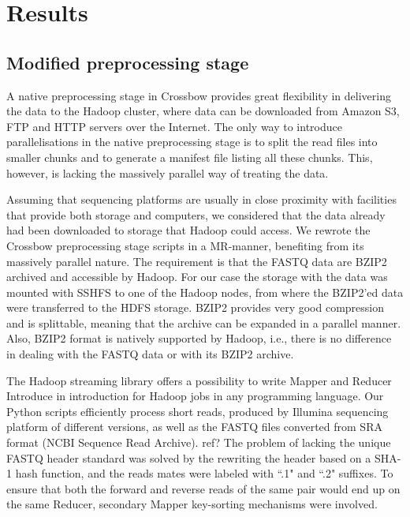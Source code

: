 \documentclass[11pt, oneside]{article}   	%
\newcommand{\COMMENT}[1]{{\color{red} #1 }}
\begin{document}
\section{Results}
\label{sectionIII}

\subsection{Modified preprocessing stage}
A native preprocessing stage in Crossbow provides great flexibility in delivering the data to the Hadoop cluster, where data can be downloaded from Amazon S3, FTP and HTTP servers over the Internet\cite{crossbow}. The only way to introduce parallelisations in the native preprocessing stage is to split the read files into smaller chunks and to generate a manifest file listing all these chunks. This, however, is lacking the massively parallel way of treating the data.


Assuming that sequencing platforms are usually in close proximity with facilities that provide both storage and computers, we considered that the data already had been downloaded to storage that Hadoop could access.
We rewrote the Crossbow preprocessing stage scripts in a MR-manner, benefiting from its massively parallel nature.
The requirement is that the FASTQ data are BZIP2 archived and accessible by Hadoop. For our case the storage with the data was mounted with SSHFS to one of the Hadoop nodes, from where the BZIP2'ed data were transferred to the HDFS storage.
BZIP2 provides very good compression and is splittable, meaning that the archive can be expanded in a parallel manner. Also, BZIP2 format is natively supported by Hadoop, i.e., there is no difference in dealing with the FASTQ data or with its BZIP2 archive.


The Hadoop streaming library offers a possibility to write Mapper and Reducer \COMMENT{Introduce in introduction} for Hadoop jobs in any programming language. Our Python scripts efficiently process short reads, produced by Illumina sequencing platform of different versions, as well as the FASTQ files converted from SRA format (NCBI Sequence Read Archive).\COMMENT{ref?} 
The problem of lacking the unique FASTQ header standard was solved by the rewriting the header based on a SHA-1 hash function, and the reads mates were labeled with ``.1" and ``.2" suffixes. 
To ensure that both the forward and reverse reads of the same pair would end up on the same Reducer, secondary Mapper key-sorting mechanisms were involved.
\end{document}
